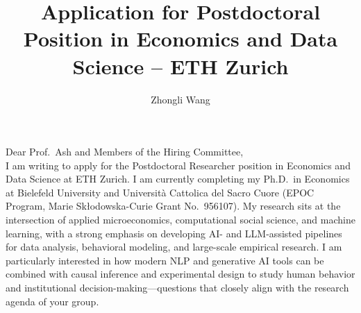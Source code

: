 \documentclass{nfr}
\title{Application for Postdoctoral Position in Economics and Data Science – ETH Zurich}
\author{Zhongli Wang}
\begin{document}

% 
% 
% 
% 


\maketitle


\noindent Dear Prof.~Ash and Members of the Hiring Committee,\\[0.2cm]

I am writing to apply for the Postdoctoral Researcher position in Economics and Data Science at ETH Zurich. 
I am currently completing my Ph.D.\ in Economics at Bielefeld University and Università Cattolica del Sacro Cuore (EPOC Program, Marie Skłodowska-Curie Grant No.~956107). 
My research sits at the intersection of applied microeconomics, computational social science, and machine learning, with a strong emphasis on developing AI- and LLM-assisted pipelines for data analysis, behavioral modeling, and large-scale empirical research. 
I am particularly interested in how modern NLP and generative AI tools can be combined with causal inference and experimental design to study human behavior and institutional decision-making—questions that closely align with the research agenda of your group.\\
\end{document}
